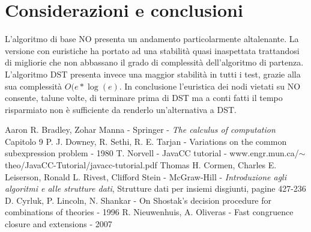 \documentclass[a4paper,11pt]{article}
\begin{document}
\par\bigskip
\par\bigskip\par\bigskip
\par\bigskip

\par\bigskip
\par\bigskip
\par\bigskip
\par\bigskip
\par\bigskip
\par\bigskip\par\bigskip
\par\bigskip\par\bigskip
\par\bigskip

\par\bigskip
\par\bigskip
\par\bigskip
\par\bigskip
\par\bigskip
\par\bigskip

\section{Considerazioni e conclusioni}
L'algoritmo di base NO presenta un andamento particolarmente altalenante.
La versione con euristiche ha portato ad una stabilità quasi inaspettata trattandosi di migliorie che non abbassano il grado di complessità dell'algoritmo di partenza.
L'algoritmo DST presenta invece una maggior stabilità in tutti i test, grazie alla sua complessità $O(e*\log(e)$.
In conclusione l'euristica dei nodi vietati su NO consente, talune volte, di terminare prima di DST ma a conti fatti il tempo risparmiato non è sufficiente da renderlo un'alternativa a DST.


\begin{thebibliography}{1}
Aaron R. Bradley, Zohar Manna - Springer - \textit {The calculus of computation} Capitolo 9
P. J. Downey, R. Sethi, R. E. Tarjan - Variations on the common subexpression problem - 1980
T. Norvell - JavaCC tutorial - www.engr.mun.ca/$\sim$theo/JavaCC-Tutorial/javacc-tutorial.pdf
Thomas H. Cormen, Charles E. Leiserson, Ronald L. Rivest, Clifford Stein - McGraw-Hill - \textit {Introduzione agli algoritmi e alle strutture dati}, Strutture dati per insiemi disgiunti, pagine 427-236
D. Cyrluk, P. Lincoln, N. Shankar - On Shostak's decision procedure for combinations of theories - 1996
R. Nieuwenhuis, A. Oliveras - Fast congruence closure and extensions - 2007

\end{thebibliography}
\end{document}
